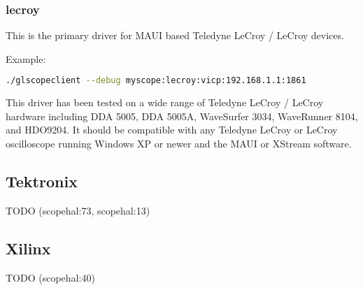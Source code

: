 \subsubsection{lecroy}

This is the primary driver for MAUI based Teledyne LeCroy / LeCroy devices.

Example:
\begin{lstlisting}[language=sh]
./glscopeclient --debug myscope:lecroy:vicp:192.168.1.1:1861
\end{lstlisting}

This driver has been tested on a wide range of Teledyne LeCroy / LeCroy hardware including DDA 5005, DDA 5005A,
WaveSurfer 3034, WaveRunner 8104, and HDO9204. It should be compatible with any Teledyne LeCroy or LeCroy oscilloscope
running Windows XP or newer and the MAUI or XStream software.

\subsection{Tektronix}
TODO (scopehal:73, scopehal:13)

\subsection{Xilinx}
TODO (scopehal:40)
